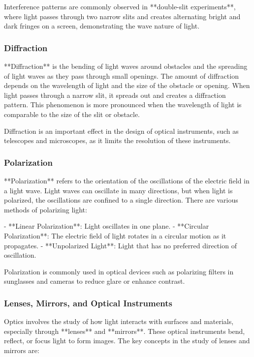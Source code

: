 \documentclass{article}
\begin{document}
Interference patterns are commonly observed in **double-slit experiments**, where light passes through two narrow slits and creates alternating bright and dark fringes on a screen, demonstrating the wave nature of light.

\subsubsection*{Diffraction}

**Diffraction** is the bending of light waves around obstacles and the spreading of light waves as they pass through small openings. The amount of diffraction depends on the wavelength of light and the size of the obstacle or opening. When light passes through a narrow slit, it spreads out and creates a diffraction pattern. This phenomenon is more pronounced when the wavelength of light is comparable to the size of the slit or obstacle.

Diffraction is an important effect in the design of optical instruments, such as telescopes and microscopes, as it limits the resolution of these instruments.

\subsubsection*{Polarization}

**Polarization** refers to the orientation of the oscillations of the electric field in a light wave. Light waves can oscillate in many directions, but when light is polarized, the oscillations are confined to a single direction. There are various methods of polarizing light:

- **Linear Polarization**: Light oscillates in one plane.
- **Circular Polarization**: The electric field of light rotates in a circular motion as it propagates.
- **Unpolarized Light**: Light that has no preferred direction of oscillation.

Polarization is commonly used in optical devices such as polarizing filters in sunglasses and cameras to reduce glare or enhance contrast.

\subsubsection*{Lenses, Mirrors, and Optical Instruments}

Optics involves the study of how light interacts with surfaces and materials, especially through **lenses** and **mirrors**. These optical instruments bend, reflect, or focus light to form images. The key concepts in the study of lenses and mirrors are:
\end{document}
